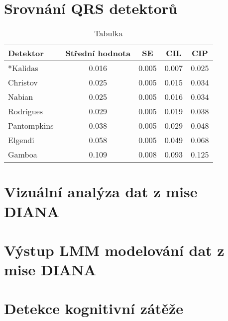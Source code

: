 \section{Srovnání QRS detektorů}
\label{sec:vysledky_qrs}

\begin{table}[h]
    \setlength{\tabcolsep}{10pt}
    \caption{\label{tab:tab1} Tabulka}
    \centering
    \begin{tabular}{lcccc}
        \toprule
        \textbf{Detektor}               & \textbf{Střední hodnota} & \textbf{SE} & \textbf{CIL} & \textbf{CIP} \\
        \midrule
        *Kalidas~\cite{kalidas2017}      & 0.016                    & 0.005       & 0.007        & 0.025        \\
        Christov~\cite{Christov2004}    & 0.025                    & 0.005       & 0.015        & 0.034        \\
        Nabian~\cite{Nabian2018}        & 0.025                    & 0.005       & 0.016        & 0.034        \\
        Rodrigues~\cite{Rodrigues2021}  & 0.029                    & 0.005       & 0.019        & 0.038        \\
        Pantompkins~\cite{Tompkins1985} & 0.038                    & 0.005       & 0.029        & 0.048        \\
        Elgendi~\cite{Elgendi2010}      & 0.058                    & 0.005       & 0.049        & 0.068        \\
        Gamboa~\cite{gamboa2008}        & 0.109                    & 0.008       & 0.093        & 0.125        \\
        \bottomrule
    \end{tabular}
\end{table}

\section{Vizuální analýza dat z mise DIANA}
\label{sec:vysledky_vizual}

\section{Výstup LMM modelování dat z mise DIANA}
\label{sec:vysledky_lmm}

\section{Detekce kognitivní zátěže}
\label{sec:vysledky_detekce_cl}